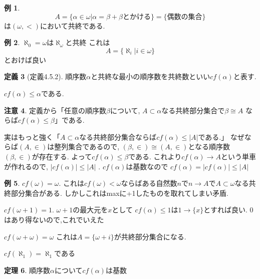 \documentclass[dvipdfmx,a4paper,11pt]{article}
\theoremstyle{definition}
\newtheorem{thm}{定理}
\newtheorem{dfn}[thm]{定義}
\newtheorem{rem}[thm]{注意}
\newtheorem{exa}[thm]{例}
\begin{document}
\begin{exa}
$$
A = \{ \alpha \in  \omega | \alpha = \beta + \beta\text{とかける}\}
=\{ \text{偶数の集合}\}
$$
は$(\omega, <)$において共終である. 
\end{exa}

\begin{exa}
$\aleph_0 = \omega$は$\aleph_{\omega}$と共終
これは
$$
A = \{\aleph_i | i \in \omega \}
$$
とおけば良い 
\end{exa}

 \begin{tcolorbox}
 [colback = white, colframe = green!35!black, fonttitle = \bfseries,breakable = true]
\begin{dfn}[定義4.5.2]
順序数$\alpha$と共終な最小の順序数を共終数といい$cf(\alpha)$と表す. 
\end{dfn}
\end{tcolorbox}
$cf(\alpha)\le \alpha$である. 

\begin{rem}
定義から「任意の順序数$\beta$について, $A \subset \alpha$なる共終部分集合で$\beta \cong A$
ならば$cf(\alpha) \le \beta$」である. 

実はもっと強く「$A \subset \alpha$なる共終部分集合ならば$cf(\alpha) \le |A|$である.」
なぜならば$(A, \in)$は整列集合であるので, $(\beta, \in) \cong (A, \in)$となる順序数$(\beta, \in)$が存在する.
よって$cf(\alpha) \le \beta$である.
これより$cf(\alpha)\to A$という単車が作れるので, $|cf(\alpha)| \le |A|$ . $cf(\alpha)$は基数なので
$cf(\alpha) = |cf(\alpha)| \le |A|$
\end{rem}

\begin{exa}
$cf(\omega) = \omega$.
これは$cf(\omega) < \omega$ならばある自然数$n$で$n \to A$で$A \subset \omega$なる共終部分集合がある. しかしこれはmaxに+1したものを取れてしまい矛盾.

$cf(\omega +1) = 1$. $\omega +1$の最大元を$x$として
$cf(\alpha) \le 1$は$1 \to \{ x\}$とすれば良い. 0はあり得ないので,これでいえた

$cf(\omega +\omega)=\omega$
これは$A = \{ \omega +i\}$が共終部分集合になる. 

$cf(\aleph_1)=\aleph_1$である
\end{exa}

 \begin{tcolorbox}
 [colback = white, colframe = green!35!black, fonttitle = \bfseries,breakable = true]
\begin{thm}
順序数$\alpha$について$cf(\alpha)$は基数
\end{thm}
\end{tcolorbox}
\end{document}

